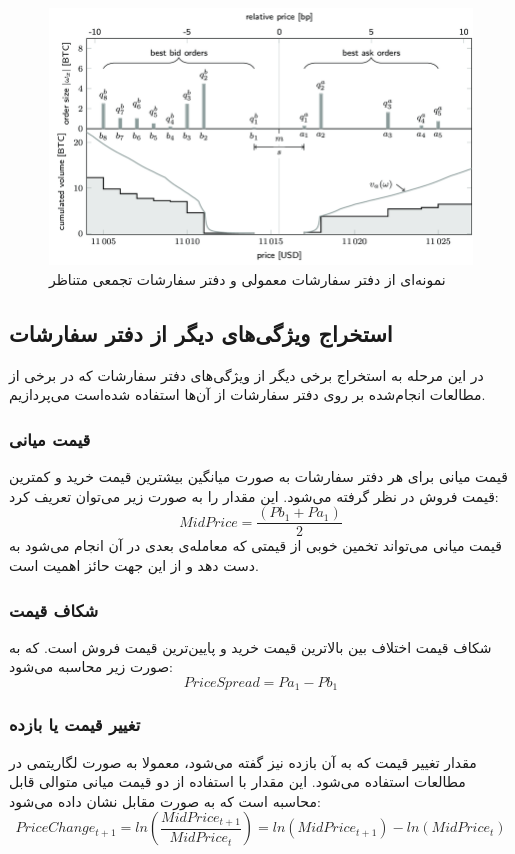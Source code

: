 \begin{figure}[!t]
	\includegraphics[width=1 \textwidth]{images/orderbook_t2}
	\centering
	\caption{نمونه‌ای از دفتر سفارشات معمولی و دفتر سفارشات تجمعی متناظر\cite{Schnaubelt2019}}
	\label{fig.orderbook_t2}
\end{figure}
\subsection{استخراج ویژگی‌های دیگر از دفتر سفارشات}
در این مرحله به استخراج برخی دیگر از ویژگی‌های دفتر سفارشات که در برخی از مطالعات انجام‌شده بر روی دفتر سفارشات از آن‌ها استفاده شده‌است می‌پردازیم.
\subsubsection{قیمت میانی}
قیمت میانی برای هر دفتر سفارشات به صورت میانگین بیشترین قیمت خرید و کمترین قیمت فروش در نظر گرفته می‌شود. این مقدار را به صورت زیر می‌توان تعریف کرد:
\begin{equation}
	MidPrice = \dfrac{(Pb_1 + Pa_1)}{2} 
\end{equation}
قیمت میانی می‌تواند تخمین خوبی از قیمتی که معامله‌ی بعدی در آن انجام می‌شود به دست دهد و از این جهت حائز اهمیت است.
\subsubsection{شکاف قیمت}
شکاف قیمت اختلاف بین بالاترین قیمت خرید و پایین‌ترین قیمت فروش است. که به صورت زیر محاسبه می‌شود:
\begin{equation}
	PriceSpread = Pa_1 - Pb_1 
\end{equation}

\subsubsection{تغییر قیمت یا بازده}
مقدار تغییر قیمت که به آن بازده نیز گفته می‌شود، معمولا به صورت لگاریتمی در مطالعات استفاده می‌شود. این مقدار با استفاده از دو قیمت میانی متوالی قابل محاسبه است که به صورت مقابل نشان داده می‌شود:
\begin{equation}
	PriceChange_{t+1} = ln(\dfrac{MidPrice_{t+1}}{MidPrice_t}) = ln(MidPrice_{t+1})  - ln(MidPrice_t)
\end{equation}

